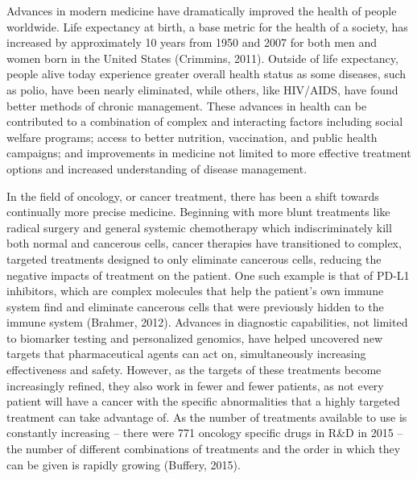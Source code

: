 \documentclass[]{spie}  %
\begin{document}
Advances in modern medicine have dramatically improved the health of people worldwide. Life expectancy at birth, a base metric for the health of a society, has increased by approximately 10 years from 1950 and 2007 for both men and women born in the United States (Crimmins, 2011). Outside of life expectancy, people alive today experience greater overall health status as some diseases, such as polio, have been nearly eliminated, while others, like HIV/AIDS, have found better methods of chronic management. These advances in health can be contributed to a combination of complex and interacting factors including social welfare programs; access to better nutrition, vaccination, and public health campaigns; and improvements in medicine not limited to more effective treatment options and increased understanding of disease management.

In the field of oncology, or cancer treatment, there has been a shift towards continually more precise medicine. Beginning with more blunt treatments like radical surgery and general systemic chemotherapy which indiscriminately kill both normal and cancerous cells, cancer therapies have transitioned to complex, targeted treatments designed to only eliminate cancerous cells, reducing the negative impacts of treatment on the patient. One such example is that of PD-L1 inhibitors, which are complex molecules that help the patient’s own immune system find and eliminate cancerous cells that were previously hidden to the immune system (Brahmer, 2012). Advances in diagnostic capabilities, not limited to biomarker testing and personalized genomics, have helped uncovered new targets that pharmaceutical agents can act on, simultaneously increasing effectiveness and safety. However, as the targets of these treatments become increasingly refined, they also work in fewer and fewer patients, as not every patient will have a cancer with the specific abnormalities that a highly targeted treatment can take advantage of. As the number of treatments available to use is constantly increasing – there were 771 oncology specific drugs in R\&D in 2015 – the number of different combinations of treatments and the order in which they can be given is rapidly growing (Buffery, 2015).
\end{document}
